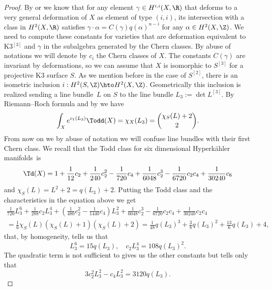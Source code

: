 \begin{proof}
By \cite[Rem.\,4.12]{F87} or \cite[Th.\,5.12]{Huy97} we know that for any element $\gamma\in H^{i,i}(X, \R)$ that deforms to a very general deformation of $X$ as element of type $(i,i)$, its intersection with a class in $H^2(X, \R)$ satisfies $\gamma\cdot \alpha =C(\gamma)q(\alpha)^{n-i}$ for any $\alpha \in H^2(X,\Z)$. We need to compute these constants for varieties that are deformation equivalent to K3$^{[3]}$ and $\gamma$ in the subalgebra generated by the Chern classes. By abuse of notations we will denote by $c_i$ the Chern classes of $X$. The constants $C(\gamma)$ are invariant by deformations, so we can assume that $X$ is isomorphic to $S^{[3]}$ for a projective K3 surface $S$. As we mention before in the case of $S^{[2]}$, there is an isometric inclusion $i:H^2(S,\Z)\hto H^2(X, \Z)$. Geometrically this inclusion is realized sending a line bundle~$L$ on $S$ to the line bundle $L_3:=\det L^{[3]}$. By Riemann--Roch formula and by \cite[Lem.\,5.1]{EGL01} we have\vspace*{-3pt}
\[\int_X e^{c_1(L_3)} \Todd(X) =\chi_X (L_3)=\binom{\chi_S(L)+2}{2}.\]
From now on we by abuse of notation we will confuse line bundles with their first Chern class. We recall that the Todd class for six dimensional Hyperkähler manifolds~is\vspace*{-3pt}%
\begin{equation}\label{todd}
\Td(X)=1+\frac{1}{12}c_2+\frac{1}{240}c_2^2-\frac{1}{720}c_4+\frac{1}{6048}c_2^3-\frac{1}{6720}c_2c_4+\frac{1}{30240}c_6
\end{equation}
and $\chi_S(L)=L^2+2=q(L_3)+2$.
Putting the Todd class and the characteristics in the equation above we get\vspace*{-3pt}
\begin{multline*}
\frac{1}{720}L_3^6+\frac{1}{288}c_2 L_3^4+(\frac{1}{480}c_2^2-\frac{1}{1440}c_4)L_3^2+\frac{1}{6048}c_2^3-\frac{1}{6720}c_2c_4+\frac{1}{30240}c_2c_4\\
=\frac{1}{6}\chi_S(L)(\chi_S(L)+1)(\chi_S(L)+2)=\frac{1}{48}q(L_3)^3+\frac{3}{8} q(L_3)^2+\frac{13}{6}q(L_3)+4,
\end{multline*}
that, by homogeneity, tells us that\vspace*{-3pt}
\[L_3^6=15q(L_3),\quad c_2 L_3^4=108q(L_3)^2.\]
The quadratic term is not sufficient to gives us the other constants but tells only that\vspace*{-3pt}%
\begin{equation}\label{chernintersectionone}
3c_2^2L_3^2-c_4L_3^2=3120q(L_3).

\end{equation}
\end{proof}
